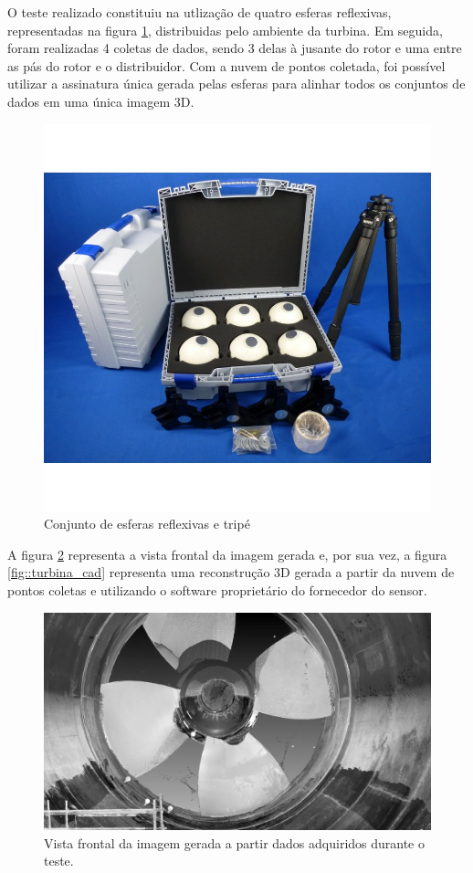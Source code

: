 O teste realizado constituiu na utlização de quatro esferas reflexivas,
representadas na figura \ref{fig::esferas}, distribuidas pelo ambiente da
turbina.
Em seguida, foram realizadas 4 coletas de dados, sendo 3 delas à jusante do
rotor e uma entre as pás do rotor e o distribuidor. Com a nuvem de pontos
coletada, foi possível utilizar a assinatura única gerada pelas esferas para
alinhar todos os conjuntos de dados em uma única imagem 3D.

\begin{figure}[h!]
\centering
	\includegraphics[width=0.9\columnwidth]{detail/figs/3dsensors/kit}
	\caption{Conjunto de esferas reflexivas e tripé}
	\label{fig::esferas}
\end{figure}

A figura \ref{fig::turbina_faro} representa a vista frontal da imagem gerada e, por sua
vez, a figura \ref{fig::turbina_cad} representa uma reconstrução 3D gerada a
partir da nuvem de pontos coletas e utilizando o software proprietário do
fornecedor do sensor. 

\begin{figure}[h!]
\centering
	\includegraphics[width=0.9\columnwidth]{detail/figs/3dsensors/recorte_video}
	\caption{Vista frontal da imagem gerada a partir dados adquiridos durante o
	teste.}
	\label{fig::turbina_faro}
\end{figure}

